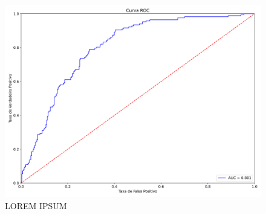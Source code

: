 \begin{figure}[h]
\begin{center} {
    \begin{center}
    \includegraphics[scale=0.65]{images/nb_roc.png}
    \caption{LOREM IPSUM}
    \label{fig:nb_grid}
    \end{center}
}
\end{center}
\end{figure}
